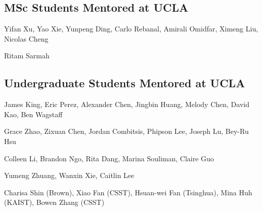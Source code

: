\subsection{MSc Students Mentored at UCLA}

 {
	 {
		Yifan Xu, Yao Xie, Yunpeng Ding, Carlo Rebanal, Amirali Omidfar, Ximeng Liu, Nicolas Cheng
	}
}

 {
	 {
		Ritam Sarmah
	}
}

\subsection{Undergraduate Students Mentored at UCLA}


 {
	 {
		James King, Eric Perez, Alexander Chen, Jingbin Huang, Melody Chen, David Kao, Ben Wagstaff
	}
}

 {
	 {
		Grace Zhao, Zixuan Chen, Jordan Combitsis, Phipson Lee, Joseph Lu, Bey-Ru Hsu
	}
}


 {
	 {
		Colleen Li, Brandon Ngo, Rita Dang, Marina Souliman, Claire Guo
	}
}


 {
	 {
		Yumeng Zhuang, Wanxin Xie, Caitlin Lee
	}
}


 {
	 {
		Charisa Shin (Brown), Xiao Fan (CSST), Hsuan-wei Fan (Tsinghua), Mina Huh (KAIST), Bowen Zhang (CSST)
	}
}

